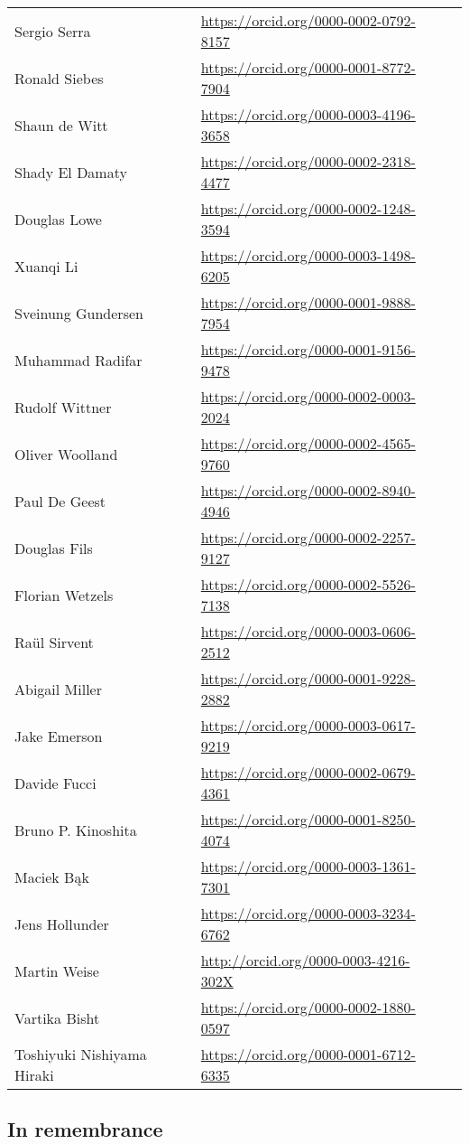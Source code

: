 \begin{longtable}{lll}
\\
  Sergio Serra & \url{https://orcid.org/0000-0002-0792-8157}
\\
  Ronald Siebes & \url{https://orcid.org/0000-0001-8772-7904}
\\
  Shaun de Witt & \url{https://orcid.org/0000-0003-4196-3658}
\\
  Shady El Damaty & \url{https://orcid.org/0000-0002-2318-4477}
\\
  Douglas Lowe & \url{https://orcid.org/0000-0002-1248-3594}
\\
  Xuanqi Li & \url{https://orcid.org/0000-0003-1498-6205}
\\
  Sveinung Gundersen & \url{https://orcid.org/0000-0001-9888-7954}
\\
  Muhammad Radifar & \url{https://orcid.org/0000-0001-9156-9478}
\\
  Rudolf Wittner & \url{https://orcid.org/0000-0002-0003-2024}
\\
  Oliver Woolland & \url{https://orcid.org/0000-0002-4565-9760}
\\
  Paul De Geest & \url{https://orcid.org/0000-0002-8940-4946}
\\
  Douglas Fils & \url{https://orcid.org/0000-0002-2257-9127}
\\
  Florian Wetzels & \url{https://orcid.org/0000-0002-5526-7138}
\\
  Raül Sirvent & \url{https://orcid.org/0000-0003-0606-2512}
\\
  Abigail Miller & \url{https://orcid.org/0000-0001-9228-2882}
\\
  Jake Emerson & \url{https://orcid.org/0000-0003-0617-9219}
\\
  Davide Fucci & \url{https://orcid.org/0000-0002-0679-4361}
\\
  Bruno P. Kinoshita & \url{https://orcid.org/0000-0001-8250-4074}
\\
  Maciek Bąk & \url{https://orcid.org/0000-0003-1361-7301}  
\\
  Jens Hollunder & \url{https://orcid.org/0000-0003-3234-6762}
\\
  Martin Weise & \url{http://orcid.org/0000-0003-4216-302X}
\\
  Vartika Bisht & \url{https://orcid.org/0000-0002-1880-0597}
\\
  Toshiyuki Nishiyama Hiraki & \url{https://orcid.org/0000-0001-6712-6335}
\end{longtable}


\subsection{In remembrance}

